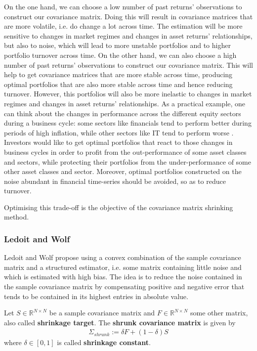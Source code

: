 	On the one hand, we can choose a low number of past returns' observations to construct our covariance matrix. Doing this will result in covariance matrices that are more volatile, i.e. do change a lot across time. The estimation will be more sensitive to changes in market regimes and changes in asset returns' relationships, but also to noise, which will lead to more unstable portfolios and to higher portfolio turnover across time. On the other hand, we can also choose a high number of past returns' observations to construct our covariance matrix. This will help to get covariance matrices that are more stable across time, producing optimal portfolios that are also more stable across time and hence reducing turnover. However, this portfolios will also be more inelastic to changes in market regimes and changes in asset returns' relationships. As a practical example, one can think about the changes in performance across the different equity sectors during a business cycle: some sectors like financials tend to perform better during periods of high inflation, while other sectors like IT tend to perform worse \cite{fidelitybusinesscycles}. Investors would like to get optimal portfolios that react to those changes in business cycles in order to profit from the out-performance of some asset classes and sectors, while protecting their portfolios from the under-performance of some other asset classes and sector. Moreover, optimal portfolios constructed on the noise abundant in financial time-series should be avoided, so as to reduce turnover.
	
	Optimising this trade-off is the objective of the covariance matrix shrinking method.
	
	\subsubsection{Ledoit and Wolf}
	    Ledoit and Wolf propose using a convex combination of the sample covariance matrix and a structured estimator, i.e. some matrix containing little noise and which is estimated with high bias. The idea is to reduce the noise contained in the sample covariance matrix by compensating positive and negative error that tends to be contained in its highest entries in absolute value.
    	
    	\begin{definition}\label{shrunkcovariancematrixdefinition}
    	    Let $S \in \mathbb{R}^{N \times N}$ be a sample covariance matrix and $F \in \mathbb{R}^{N \times N}$ some other matrix, also called \textbf{shrinkage target}. The \textbf{shrunk covariance matrix} is given by
    	    \begin{align*}
    	        \Sigma_{shrunk} := \delta F + (1-\delta) S
    	    \end{align*}
    	    where $\delta \in [0, 1 ]$ is called \textbf{shrinkage constant}.
    	\end{definition}
    	
